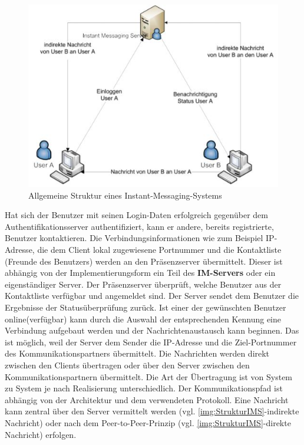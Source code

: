 \documentclass[a4paper,titlepage,halfparskip,12pt]{scrreprt}
\begin{document}
\begin{onehalfspacing}
\begin{figure}[h]
	\centering
	\includegraphics{images/GrundlegendeStrukturIMS}
	\caption{Allgemeine Struktur eines Instant-Messaging-Systems}
	\label{img:StrukturIMS}
\end{figure}

Hat sich der Benutzer mit seinen Login-Daten erfolgreich gegenüber dem Authentifikationsserver authentifiziert, kann er andere, bereits registrierte, Benutzer kontaktieren. Die Verbindungsinformationen wie zum Beispiel IP-Adresse, die dem Client lokal zugewiesene Portnummer und die Kontaktliste (Freunde des Benutzers) werden an den Präsenzserver übermittelt. Dieser ist abhängig von der Implementierungsform ein Teil des \textbf{IM-Servers} oder ein eigenständiger Server. Der Präsenzserver überprüft, welche Benutzer aus der Kontaktliste verfügbar und angemeldet sind. Der Server sendet dem Benutzer die Ergebnisse der Statusüberprüfung zurück. Ist einer der gewünschten Benutzer \glqq online\grqq (verfügbar) kann durch die Auswahl der entsprechenden Kennung eine Verbindung aufgebaut werden und der Nachrichtenaustausch kann beginnen. Das ist möglich, weil der Server dem Sender die IP-Adresse und die Ziel-Portnummer des Kommunikationspartners übermittelt. Die Nachrichten werden direkt zwischen den Clients übertragen oder über den Server zwischen den Kommunikationspartnern übermittelt. Die Art der Übertragung ist von System zu System je nach Realisierung unterschiedlich. Der Kommunikationspfad ist abhängig von der Architektur und dem verwendeten Protokoll. Eine Nachricht kann zentral über den Server vermittelt werden (vgl. \autoref{img:StrukturIMS}-indirekte Nachricht) oder nach dem Peer-to-Peer-Prinzip (vgl. \autoref{img:StrukturIMS}-direkte Nachricht) erfolgen. 


\end{onehalfspacing}
\end{document}
